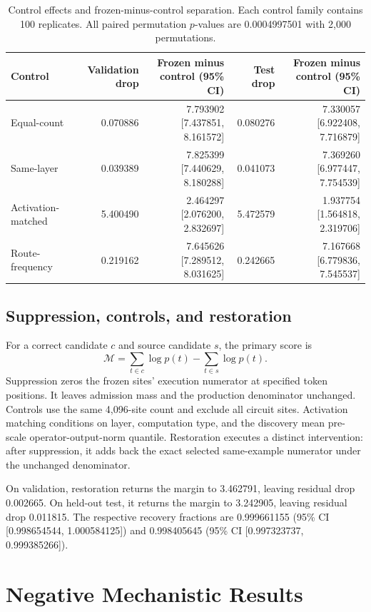 \documentclass{article}
\begin{document}
\begin{table}[!t]
\centering
\caption{Control effects and frozen-minus-control separation. Each control
family contains 100 replicates. All paired permutation \(p\)-values are
0.0004997501 with 2,000 permutations.}
\label{tab:controls}
\scriptsize
\renewcommand{\arraystretch}{0.96}
\begin{tabular}{lrrrr}
\toprule
Control & Validation drop & Frozen minus control (95\% CI) &
Test drop & Frozen minus control (95\% CI)\\
\midrule
Equal-count & 0.070886 & 7.793902 [7.437851, 8.161572] &
0.080276 & 7.330057 [6.922408, 7.716879]\\
Same-layer & 0.039389 & 7.825399 [7.440629, 8.180288] &
0.041073 & 7.369260 [6.977447, 7.754539]\\
Activation-matched & 5.400490 & 2.464297 [2.076200, 2.832697] &
5.472579 & 1.937754 [1.564818, 2.319706]\\
Route-frequency & 0.219162 & 7.645626 [7.289512, 8.031625] &
0.242665 & 7.167668 [6.779836, 7.545537]\\
\bottomrule
\end{tabular}
\end{table}

\subsection{Suppression, controls, and restoration}

For a correct candidate \(c\) and source candidate \(s\), the primary score is
\[
\mathcal{M}=\sum_{t\in c}\log p(t)-\sum_{t\in s}\log p(t).
\]
Suppression zeros the frozen sites' execution numerator at specified token
positions. It leaves admission mass and the production denominator unchanged.
Controls use the same 4,096-site count and exclude all circuit sites.
Activation matching conditions on layer, computation type, and the discovery mean
pre-scale operator-output-norm quantile. Restoration executes a distinct
intervention: after suppression, it adds back the exact selected same-example
numerator under the unchanged denominator.

On validation, restoration returns the margin to 3.462791, leaving residual
drop 0.002665. On held-out test, it returns the margin to 3.242905, leaving
residual drop 0.011815. The respective recovery fractions are 0.999661155
(95\% CI [0.998654544, 1.000584125]) and 0.998405645
(95\% CI [0.997323737, 0.999385266]).

\section{Negative Mechanistic Results}
\label{app:negative}
\end{document}
